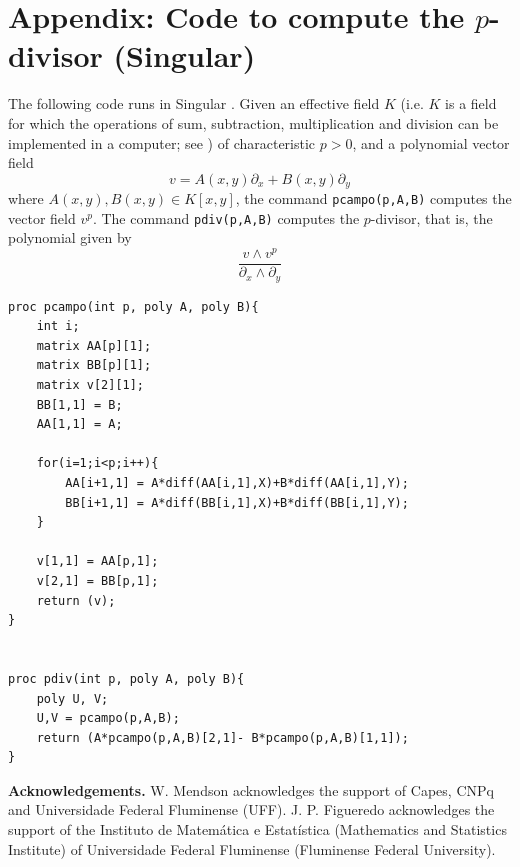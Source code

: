 \documentclass[reqno,oneside,11pt]{amsart}
\theoremstyle{definition}
\begin{document}
\section{Appendix: Code to compute the \texorpdfstring{$p$}{p}-divisor (Singular)} \label{appe}

The following code runs in Singular \cite{DGPS}.  
Given an effective field $K$ (i.e. $K$ is a field for which the operations of sum, subtraction, multiplication and division can be implemented in a computer; see \cite{coutinho2018bounding}) of characteristic $p>0$, and a polynomial vector field 
$$v = A(x,y)\partial_{x}+B(x,y)\partial_{y}$$
where $A(x,y), B(x,y) \in K[x,y]$, the command \verb+pcampo(p,A,B)+ computes the vector field $v^{p}$. The command \verb+pdiv(p,A,B)+ computes the $p$-divisor, that is, the polynomial given by 
$$
   \frac{v\wedge v^{p}}{\partial_x \wedge\partial_y}
$$

\vspace{0.2cm}

\begin{verbatim}
proc pcampo(int p, poly A, poly B){
    int i; 
    matrix AA[p][1]; 
    matrix BB[p][1]; 
    matrix v[2][1]; 
    BB[1,1] = B; 
    AA[1,1] = A; 
    
    for(i=1;i<p;i++){
        AA[i+1,1] = A*diff(AA[i,1],X)+B*diff(AA[i,1],Y);
        BB[i+1,1] = A*diff(BB[i,1],X)+B*diff(BB[i,1],Y);
    }

    v[1,1] = AA[p,1];
    v[2,1] = BB[p,1];
    return (v);
}


proc pdiv(int p, poly A, poly B){
    poly U, V;
    U,V = pcampo(p,A,B);
    return (A*pcampo(p,A,B)[2,1]- B*pcampo(p,A,B)[1,1]);
}
\end{verbatim}


\noindent\textbf{Acknowledgements.}  W. Mendson acknowledges the
support of Capes, CNPq and Universidade Federal Fluminense (UFF). J. P. Figueredo acknowledges the support of the Instituto de Matemática e Estatística (Mathematics and Statistics Institute) of Universidade Federal Fluminense (Fluminense Federal University).





\end{document}
